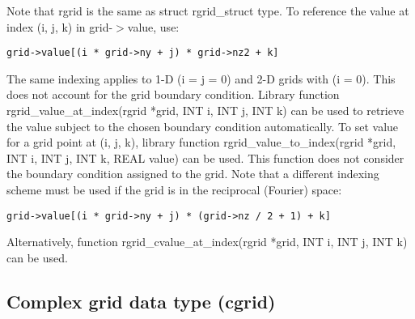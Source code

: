 \documentclass[12pt,letterpaper]{report}
\begin{document}
\noindent
Note that rgrid is the same as struct rgrid\_struct type. To reference the value at index (i, j, k) in grid-$>$value, use:
\begin{verbatim}
grid->value[(i * grid->ny + j) * grid->nz2 + k]
\end{verbatim}
The same indexing applies to 1-D (i = j = 0) and 2-D grids with (i = 0). This does not account for the grid boundary condition. Library function rgrid\_value\_at\_index(rgrid *grid, INT i, INT j, INT k) can be used to retrieve the value subject to the chosen boundary condition automatically. To set value for a grid point at (i, j, k), library function rgrid\_value\_to\_index(rgrid *grid, INT i, INT j, INT k, REAL value) can be used. This function does not consider the boundary condition assigned to the grid. Note that a different indexing scheme must be used if the grid is in the reciprocal (Fourier) space:
\begin{verbatim}
grid->value[(i * grid->ny + j) * (grid->nz / 2 + 1) + k]
\end{verbatim}
Alternatively, function rgrid\_cvalue\_at\_index(rgrid *grid, INT i, INT j, INT k) can be used.

\subsection{Complex grid data type (cgrid)}
\end{document}
